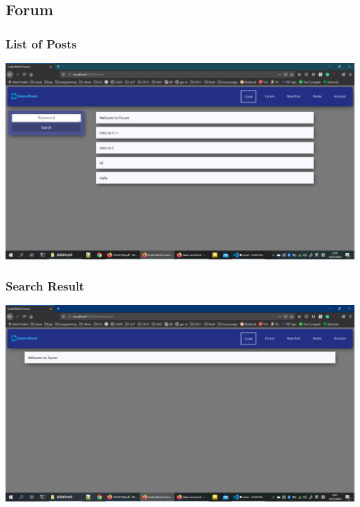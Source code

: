 \subsection{Forum}
\subsubsection{List of Posts}
\includegraphics[scale=0.45]{Doc/Pics/post_list.png}
\subsubsection{Search Result}
\includegraphics[scale=0.45]{Doc/Pics/search_result.png}
